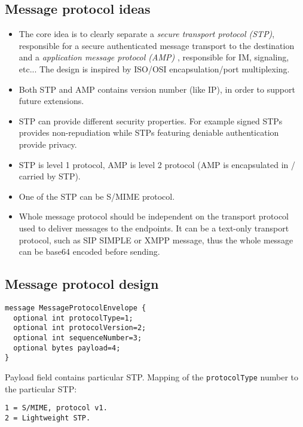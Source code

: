 \documentclass[a4paper,10pt]{article}
\begin{document}
\subsection{Message protocol ideas}
\begin{itemize}
 \item The core idea is to clearly separate a {\it secure transport protocol (STP)}, responsible for a secure authenticated message transport to the destination
and a {\it application message protocol (AMP) }, responsible for IM, signaling, etc... The design is inspired by ISO/OSI encapsulation/port multiplexing.

 \item Both STP and AMP contains version number (like IP), in order to support future extensions.

 \item STP can provide different security properties. For example signed STPs provides non-repudiation while STPs featuring deniable authentication
provide privacy.

 \item STP is level 1 protocol, AMP is level 2 protocol (AMP is encapsulated in / carried by STP).
 
 \item One of the STP can be S/MIME protocol.  
 
 \item Whole message protocol should be independent on the transport protocol used to deliver messages to the endpoints. It can be
 a text-only transport protocol, such as SIP SIMPLE or XMPP message, thus the whole message can be base64 encoded before sending.
\end{itemize}

\subsection{Message protocol design}
\begin{Verbatim}[frame=single]
message MessageProtocolEnvelope {
  optional int protocolType=1;
  optional int protocolVersion=2;
  optional int sequenceNumber=3;
  optional bytes payload=4;
}
\end{Verbatim} 

Payload field contains particular STP. Mapping of the \verb#protocolType# number to the particular STP:\\
\begin{Verbatim}[frame=single]
1 = S/MIME, protocol v1.
2 = Lightweight STP. 
\end{Verbatim} 
\end{document}
